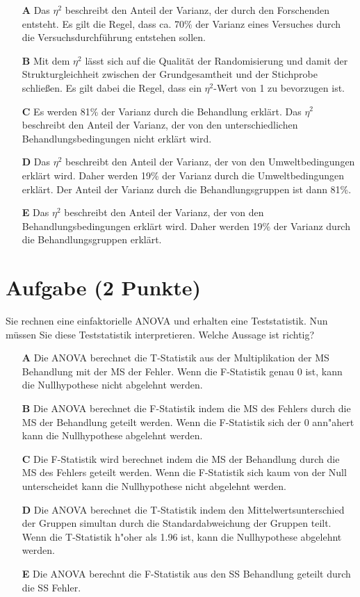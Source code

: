 \documentclass[a4paper, 9pt]{scrartcl}\usepackage[]{graphicx}\usepackage[]{xcolor}
\begin{document}
\begin{enumerate}
\item [\textbf{A} \msquare] Das $\eta^2$ beschreibt den Anteil der Varianz, der durch den Forschenden entsteht. Es gilt die Regel, dass ca. 70\% der Varianz eines Versuches durch die Versuchsdurchführung entstehen sollen.
\item [\textbf{B} \msquare] Mit dem $\eta^2$ lässt sich auf die Qualität der Randomisierung und damit der Strukturgleichheit zwischen der Grundgesamtheit und der Stichprobe schließen. Es gilt dabei die Regel, dass ein $\eta^2$-Wert von 1 zu bevorzugen ist.
\item [\textbf{C} \msquare] Es werden 81\% der Varianz durch die Behandlung erklärt. Das $\eta^2$ beschreibt den Anteil der Varianz, der von den unterschiedlichen Behandlungsbedingungen nicht erklärt wird.
\item [\textbf{D} \msquare] Das $\eta^2$ beschreibt den Anteil der Varianz, der von den Umweltbedingungen erklärt wird. Daher werden 19\% der Varianz durch die Umweltbedingungen erklärt. Der Anteil der Varianz durch die Behandlungsgruppen ist dann 81\%.
\item [\textbf{E} \msquare] Das $\eta^2$ beschreibt den Anteil der Varianz, der von den Behandlungsbedingungen erklärt wird. Daher werden 19\% der Varianz durch die Behandlungsgruppen erklärt.
\end{enumerate} 

\section{Aufgabe \hfill (2 Punkte)}



Sie rechnen eine einfaktorielle ANOVA und erhalten eine Teststatistik. Nun müssen Sie diese Teststatistik interpretieren. Welche Aussage ist richtig?



\begin{enumerate}
\item [\textbf{A} \msquare] Die ANOVA berechnet die T-Statistik aus der Multiplikation der MS Behandlung mit der MS der Fehler. Wenn die F-Statistik genau 0 ist, kann die Nullhypothese nicht abgelehnt werden.
\item [\textbf{B} \msquare] Die ANOVA berechnet die F-Statistik indem die MS des Fehlers durch die MS der Behandlung geteilt werden. Wenn die F-Statistik sich der 0 ann{"a}hert kann die Nullhypothese abgelehnt werden.
\item [\textbf{C} \msquare] Die F-Statistik wird berechnet indem die MS der Behandlung durch die MS des Fehlers geteilt werden. Wenn die F-Statistik sich kaum von der Null unterscheidet kann die Nullhypothese nicht abgelehnt werden.
\item [\textbf{D} \msquare] Die ANOVA berechnet die T-Statistik indem den Mittelwertsunterschied der Gruppen simultan durch die Standardabweichung der Gruppen teilt. Wenn die T-Statistik h{"o}her als 1.96 ist, kann die Nullhypothese abgelehnt werden.
\item [\textbf{E} \msquare] Die ANOVA berechnt die F-Statistik aus den SS Behandlung geteilt durch die SS Fehler.
\end{enumerate} 
\end{document}
